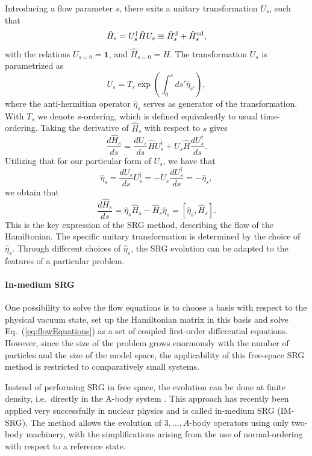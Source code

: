 \documentclass[amsmath, amssymb, aps, floatfix, nofootinbib, preprintnumbers,showpacs, superscriptaddress, twocolumn]{revtex4-1}
\newcommand{\Hd}{\hat{H}^{\rm d}}
\newcommand{\Ho}{\hat{H}^{\rm od}}
\newcommand{\be}{\begin{equation}}
\newcommand{\ee}{\end{equation}}
\begin{document}
 Introducing a flow parameter $s$, there exits a unitary
 transformation $U_s$, such that
\begin{equation}
 \hat{H}_s = U_s^\dagger \hat{H} U_s \equiv \Hd_s + \Ho_s,
\end{equation}
with the relations $U_{s=0} = \mathbf{1}$, and $\hat{H}_{s= 0} =
\hat{H}$.  The transformation $U_s$ is parametrized as
\[
U_s = T_s \exp \left(\int_0^s \! ds'\hat{\eta}_{s'} \right),
\]
where the anti-hermitian operator $\hat{\eta}_s$ serves as generator
of the transformation. With $T_s$ we denote $s$-ordering, which is
defined equivalently to usual time-ordering.  Taking the derivative of
$\hat{H}_s$ with respect to $s$ gives
\begin{equation}
 \frac{d \hat{H}_s}{ds} = \frac{d U_s}{ds}\hat{H} U_s^\dagger + U_s
 \hat{H} \frac{d U_s^\dagger}{ds}.
\label{eq:flow_long}
\end{equation}
Utilizing that for our particular form of $U_s$, we have that \be
\hat{\eta}_s = \frac{d U_s}{ds} U_s^\dagger = - U_s \frac{d
  U_s^\dagger}{ds} = -\hat{\eta}_s,
\label{eq:eta}
\ee we obtain that \be \frac{d \hat{H}_s}{ds} = \hat{\eta}_s \hat{H}_s
- \hat{H}_s \hat{\eta}_s = \left[\hat{\eta}_s, \hat{H}_s \right].
\label{eq:flowEquations}
\ee This is the key expression of the SRG method, describing the flow
of the Hamiltonian.  The specific unitary transformation is determined
by the choice of $\hat{\eta}_s$.  Through different choices of
$\hat{\eta}_s$, the SRG evolution can be adapted to the features of a
particular problem.\\

\paragraph*{In-medium SRG}

One possibility to solve the flow equations is to choose a basis with
respect to the physical vacuum state, set up the Hamiltonian matrix in
this basis and solve Eq.~(\ref{eq:flowEquations}) as a set of coupled
first-order differential equations. However, since the size of the
problem grows enormously with the number of particles and the size of
the model space, the applicability of this free-space SRG method is
restricted to comparatively small systems.

Instead of performing SRG in free space, the evolution can be done at
finite density, i.e.~directly in the A-body system
\cite{kehrein2006flow}. This approach has recently been applied very
successfully in nuclear physics \cite{IMSRG,PhysRevLett.106.222502}
and is called in-medium SRG (IM-SRG). The method allows the evolution
of $3,...,A$-body operators using only two-body machinery, with the
simplifications arising from the use of normal-ordering with respect
to a reference state.
\end{document}
